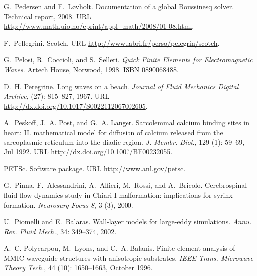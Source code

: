 \begin{thebibliography}{467}
G.~Pedersen and F.~L{\o}vholt.
\newblock Documentation of a global {B}oussinesq solver.
\newblock Technical report, 2008.
\newblock URL \url{http://www.math.uio.no/eprint/appl_math/2008/01-08.html}.

F.~Pellegrini.
\newblock Scotch.
\newblock URL \url{http://www.labri.fr/perso/pelegrin/scotch}.

G.~Pelosi, R.~Coccioli, and S.~Selleri.
\newblock \emph{Quick Finite Elements for Electromagnetic Waves}.
\newblock Artech House, Norwood, 1998.
\newblock ISBN 0890068488.

D.~H. Peregrine.
\newblock Long waves on a beach.
\newblock \emph{Journal of Fluid Mechanics Digital Archive}, 
  (27): 815--827, 1967.
\newblock URL \url{http://dx.doi.org/10.1017/S0022112067002605}.

A.~Peskoff, J.~A. Post, and G.~A. Langer.
\newblock Sarcolemmal calcium binding sites in heart: {II}. mathematical model
  for diffusion of calcium released from the sarcoplasmic reticulum into the
  diadic region.
\newblock \emph{J. Membr. Biol.}, 129 (1): 59--69, Jul 1992.
\newblock URL \url{http://dx.doi.org/10.1007/BF00232055}.

PETSc.
\newblock Software package.
\newblock URL \url{http://www.anl.gov/petsc}.

G.~Pinna, F.~Alessandrini, A.~Alfieri, M.~Rossi, and A.~Bricolo.
\newblock Cerebrospinal fluid flow dynamics study in {C}hiari {I} malformation:
  implications for syrinx formation.
\newblock \emph{Neurosurg Focus 8}, 3 (3), 2000.

U.~Piomelli and E.~Balaras.
\newblock Wall-layer models for large-eddy simulations.
\newblock \emph{Annu. Rev. Fluid Mech.}, 34: 349--374, 2002.

A.~C. Polycarpou, M.~Lyons, and C.~A. Balanis.
\newblock Finite element analysis of {MMIC} waveguide structures with
  anisotropic substrates.
\newblock \emph{IEEE Trans. Microwave Theory Tech.}, 44 (10):
  1650--1663, October 1996.


\end{thebibliography}
